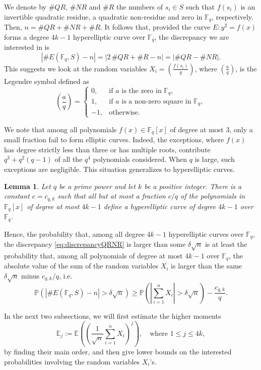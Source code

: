 \documentclass{amsart}
\theoremstyle{plain}
\newtheorem{lemma}[theorem]{Lemma}
\theoremstyle{definition}
\newcommand{\legendre}[2]{\genfrac{(}{)}{}{}{#1}{#2}}
\newcommand{\EE}{\mathbb{E}}
\newcommand{\PP}{\mathbb{P}}
\newcommand{\Fq}{\mathbb{F}_q}
\newcommand{\abs}[1]{\left|#1\right|}
\begin{document}
We denote by $\#QR$, $\#NR$ and $\#R$ the numbers of $s_i\in{S}$ such that $f(s_i)$ is an invertible quadratic residue, a quadratic non-residue and zero in $\Fq$, respectively. Then, $n=\#QR+\#NR+\#R$. It follows that, provided the curve $E:y^2=f(x)$ forms a degree $4k-1$ hyperelliptic curve over $\Fq$, the discrepancy we are interested in is
\begin{equation}
\label{eq:discrepancyQRNR}
\abs{\#E(\Fq,S)-n}=\abs{2\,\#QR+\#R-n}=\abs{\#QR-\#NR}.
\end{equation}
This suggests we look at the random variables $X_i=\legendre{f(s_i)}{q}$, where $\legendre{a}{q}$, is the Legendre symbol defined as
\[
\legendre{a}{q}=\begin{cases}
0,&\mbox{if $a$ is the zero in $\Fq$},\\
1,&\mbox{if $a$ is a non-zero square in $\Fq$},\\
-1,&\text{otherwise.}
\end{cases}
\]

We note that among all polynomials $f(x)\in\Fq[x]$ of degree at most 3, only a small fraction fail to form elliptic curves. Indeed, the exceptions, where $f(x)$ has degree strictly less than three or has multiple roots, contribute $q^3+q^2(q-1)$ of all the $q^4$ polynomials considered. When $q$ is large, such exceptions are negligible. This situation generalizes to hyperelliptic curves.

\begin{lemma}
\label{lem:constantc_k}
Let $q$ be a prime power and let $k$ be a positive integer. There is a constant $c=c_{q,k}$ such that all but at most a fraction $c/q$ of the polynomials in $\Fq[x]$ of degree at most $4k-1$ define a hyperelliptic curve of degree $4k-1$ over $\Fq$. 
\end{lemma}

Hence, the probability that, among all degree $4k-1$ hyperelliptic curves over $\Fq$, the discrepancy \eqref{eq:discrepancyQRNR} is larger than some $\delta\sqrt{n}$ is at least the probability that, among all polynomials of degree at most $4k-1$ over $\Fq$, the absolute value of the sum of the random variables $X_i$ is larger than the same $\delta\sqrt{n}$ minus $c_{q,k}/q$, i.e.
\begin{equation}
\label{eq:probabilityInequality}
\PP(\abs{\#E(\Fq,S)-n}>\delta\sqrt{n})\geq\PP\left(\abs{\sum_{i=1}^nX_i}>\delta\sqrt{n}\right)-\dfrac{c_{q,k}}{q}.
\end{equation}

In the next two subsections, we will first estimate the higher moments
\[
\EE_{j}:=\EE\left(\left(\dfrac{1}{\sqrt{n}}\sum_{i=1}^{n}X_i\right)^{j}\right),\quad\text{where }1\leq{j}\leq{4k},
\]
by finding their main order, and then give lower bounds on the interested probabilities involving the random variables $X_i$'s.
\end{document}
